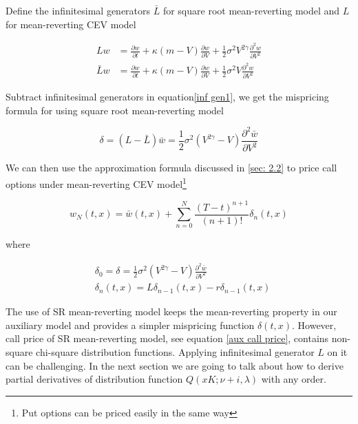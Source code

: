 Define the infinitesimal generators $\bar{L}$ for square root mean-reverting model and $L$ for mean-reverting CEV model

\begin{equation}\label{inf gen1}
    \begin{aligned}
        L w&= \frac{\partial w}{\partial t}+\kappa(m - V) \frac{\partial w}{\partial V}+\frac{1}{2} \sigma^{2} V^{2\gamma} \frac{\partial^{2} w}{\partial V^{2}} \\
        \bar{L} w &= \frac{\partial w}{\partial t}+\kappa(m - V) \frac{\partial w}{\partial V}+\frac{1}{2} \sigma^{2} V \frac{\partial^{2} w}{\partial V^{2}}
    \end{aligned}
\end{equation}

Subtract infinitesimal generators in equation\eqref{inf gen1}, we get the mispricing formula for using square root mean-reverting model

$$
\delta = (L - \bar{L}) \bar{w} = \frac{1}{2} \sigma^{2} (V^{2\gamma} - V) \frac{\partial^{2} \bar{w}}{\partial V^{2}}
$$

\noindent We can then use the approximation formula discussed in \ref{sec: 2.2} to price call options under mean-reverting CEV model\footnote{Put options can be priced easily in the same way}

\begin{equation} \label{cev approx formula}
    w_{N}(t, x)=\bar{w}(t,x)+\sum_{n=0}^{N} \frac{(T-t)^{n+1}}{(n+1) !} \delta_{n}(t, x)
\end{equation}

\noindent where

\begin{equation}\label{mispricing}
    \begin{aligned}
        &\delta_0 = \delta = \frac{1}{2} \sigma^{2} (V^{2\gamma} - V) \frac{\partial^{2} \bar{w}}{\partial V^{2}} \\
        &\delta_{n}(t, x)=L \delta_{n-1}(t, x)- r\delta_{n-1}(t, x)
        \end{aligned}
\end{equation}

The use of SR mean-reverting model keeps the mean-reverting property in our auxiliary model and provides a simpler mispricing function $\delta(t,x)$. However, call price of SR mean-reverting model, see equation \eqref{aux call price}, contains non-square chi-square distribution functions. Applying infinitesimal generator $L$ on it can be challenging. In the next section we are going to talk about how to derive partial derivatives of distribution function $Q(xK; \nu+i, \lambda)$ with any order.

